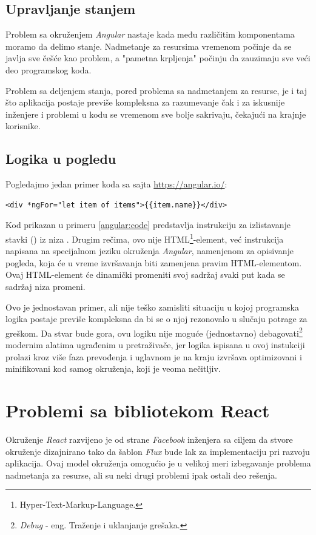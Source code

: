 \documentclass[12pt,oneside]{memoir}
\newcommand{\code}[1]{\colorbox{codegray}{\texttt{\scalebox{0.9}{#1}}}}%
\begin{document}
\subsection{Upravljanje stanjem} \label{subsec:upravljanje-stanjem}

Problem sa okruženjem \emph{Angular} nastaje kada među različitim komponentama moramo da delimo stanje.
Nadmetanje za resursima vremenom počinje da se javlja sve češće kao problem, a "pametna krpljenja" počinju
da zauzimaju sve veći deo programskog koda.

Problem sa deljenjem stanja, pored problema sa nadmetanjem za resurse, je i taj što aplikacija postaje previše kompleksna
za razumevanje čak i za iskusnije inženjere i problemi u kodu se vremenom sve bolje sakrivaju,
čekajući na krajnje korisnike.


\subsection{Logika u pogledu} \label{subsec:logika-u-pogledu}
Pogledajmo jedan primer koda sa sajta \url{https://angular.io/}:
\begin{lstlisting}[style=htmlStyle, caption={Primer koda u \emph{Angular}-u},label=angular:code]
<div *ngFor="let item of items">{{item.name}}</div>
\end{lstlisting}
Kod prikazan u primeru \ref{angular:code} predstavlja instrukciju za izlistavanje stavki (\code{item}) iz niza \code{items}.
Drugim rečima, ovo nije HTML\footnote{Hyper-Text-Markup-Language.}-element, već instrukcija napisana na 
specijalnom jeziku okruženja \emph{Angular}, namenjenom za opisivanje
pogleda, koja će u vreme izvršavanja biti zamenjena pravim HTML-elementom. Ovaj HTML-element će dinamički promeniti svoj sadržaj
svaki put kada se sadržaj niza \code{items} promeni. 

Ovo je jednostavan primer, ali nije teško zamisliti situaciju u kojoj programska logika postaje previše kompleksna
da bi se o njoj rezonovalo u slučaju potrage za greškom. Da stvar bude gora, ovu logiku nije moguće (jednostavno) debagovati\footnote{\emph{Debug} - eng. Traženje i uklanjanje grešaka.}
modernim alatima ugrađenim u pretraživače,
jer logika ispisana u ovoj instukciji prolazi kroz više faza prevođenja i uglavnom je na kraju izvršava
optimizovani i minifikovani kod samog okruženja, koji je veoma nečitljiv.
\section{Problemi sa bibliotekom React}
Okruženje \emph{React} razvijeno je od strane \emph{Facebook} inženjera sa ciljem da stvore okruženje
dizajnirano tako da šablon \emph{Flux} bude lak za implementaciju pri razvoju aplikacija.
Ovaj model okruženja omogućio je u velikoj meri izbegavanje problema nadmetanja za resurse, ali
su neki drugi problemi ipak ostali deo rešenja.
\end{document}
